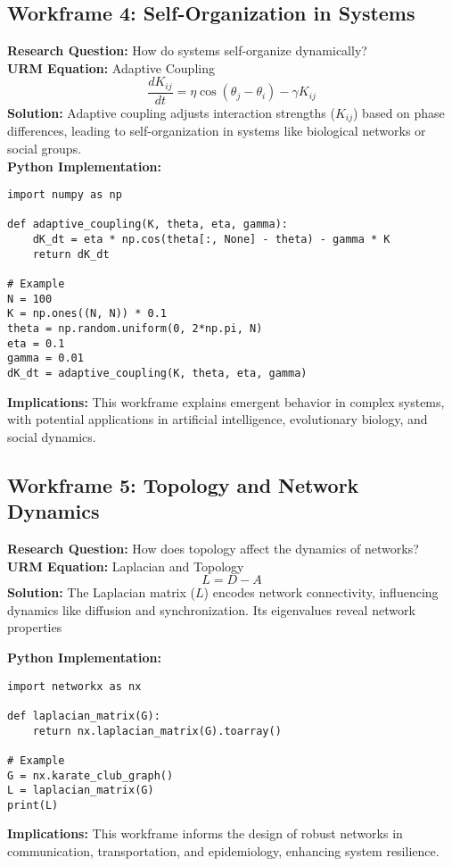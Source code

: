 \documentclass[12pt]{article}
\begin{document}
\subsection{Workframe 4: Self-Organization in Systems}
\textbf{Research Question:} How do systems self-organize dynamically? \\
\textbf{URM Equation:} Adaptive Coupling
\[
\frac{dK_{ij}}{dt} = \eta \cos(\theta_j - \theta_i) - \gamma K_{ij}
\]
\textbf{Solution:} Adaptive coupling adjusts interaction strengths (\(K_{ij}\)) based on phase differences, leading to self-organization in systems like biological networks or social groups. \\
\textbf{Python Implementation:}
\begin{lstlisting}[caption={Adaptive Coupling Simulation}]
import numpy as np

def adaptive_coupling(K, theta, eta, gamma):
    dK_dt = eta * np.cos(theta[:, None] - theta) - gamma * K
    return dK_dt

# Example
N = 100
K = np.ones((N, N)) * 0.1
theta = np.random.uniform(0, 2*np.pi, N)
eta = 0.1
gamma = 0.01
dK_dt = adaptive_coupling(K, theta, eta, gamma)
\end{lstlisting}
\textbf{Implications:} This workframe explains emergent behavior in complex systems, with potential applications in artificial intelligence, evolutionary biology, and social dynamics.

\clearpage

\subsection{Workframe 5: Topology and Network Dynamics}
\textbf{Research Question:} How does topology affect the dynamics of networks? \\
\textbf{URM Equation:} Laplacian and Topology
\[
L = D - A
\]
\textbf{Solution:} The Laplacian matrix (\(L\)) encodes network connectivity, influencing dynamics like diffusion and synchronization. Its eigenvalues reveal network properties 

\textbf{Python Implementation:}
\begin{lstlisting}[caption={Laplacian Matrix Calculation}]
import networkx as nx

def laplacian_matrix(G):
    return nx.laplacian_matrix(G).toarray()

# Example
G = nx.karate_club_graph()
L = laplacian_matrix(G)
print(L)
\end{lstlisting}
\textbf{Implications:} This workframe informs the design of robust networks in communication, transportation, and epidemiology, enhancing system resilience.
\end{document}
